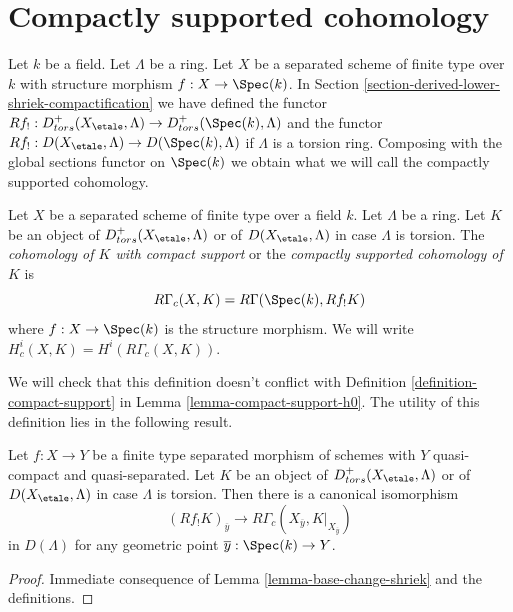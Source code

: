 \section{Compactly supported cohomology}
\label{section-compactly-supported-cohomology}

\noindent
Let $k$ be a field. Let $\Lambda$ be a ring. Let $X$ be a separated scheme
of finite type over $k$ with structure morphism $f : X \to \Spec(k)$.
In Section \ref{section-derived-lower-shriek-compactification}
we have defined the functor
$Rf_! : D^+_{tors}(X_\etale, \Lambda) \to D^+_{tors}(\Spec(k), \Lambda)$
and the functor $Rf_! : D(X_\etale, \Lambda) \to D(\Spec(k), \Lambda)$
if $\Lambda$ is a torsion ring. Composing with the global sections functor
on $\Spec(k)$ we obtain what we will call the compactly supported cohomology.

\begin{definition}
\label{definition-cohomology-compact-support}
Let $X$ be a separated scheme of finite type over a field $k$.
Let $\Lambda$ be a ring. Let $K$ be an object of
$D^+_{tors}(X_\etale, \Lambda)$
or of $D(X_\etale, \Lambda)$ in case $\Lambda$ is torsion.
The {\it cohomology of $K$ with compact support} or the
{\it compactly supported cohomology of $K$} is
$$
R\Gamma_c(X, K) = R\Gamma(\Spec(k), Rf_!K)
$$
where $f : X \to \Spec(k)$ is the structure morphism. We will
write  $H^i_c(X, K) = H^i(R\Gamma_c(X, K))$.
\end{definition}

\noindent
We will check that this definition doesn't conflict with
Definition \ref{definition-compact-support} in
Lemma \ref{lemma-compact-support-h0}.
The utility of this definition lies in the following result.

\begin{lemma}
\label{lemma-stalk-R-f-shriek}
Let $f : X \to Y$ be a finite type separated morphism of schemes
with $Y$ quasi-compact and quasi-separated. Let $K$ be an object of
$D^+_{tors}(X_\etale, \Lambda)$ or of $D(X_\etale, \Lambda)$ in case
$\Lambda$ is torsion. Then there is a canonical isomorphism
$$
(Rf_!K)_{\overline{y}}
\longrightarrow
R\Gamma_c(X_{\overline{y}}, K|_{X_{\overline{y}}})
$$
in $D(\Lambda)$ for any geometric point $\overline{y} : \Spec(k) \to Y$.
\end{lemma}

\begin{proof}
Immediate consequence of Lemma \ref{lemma-base-change-shriek} and the
definitions.
\end{proof}

